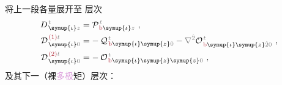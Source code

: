 将上一段各量展开至  层次
\begin{subequations} \label{eq:DH^(2-0)_0}
\begin{align}
	D^{\;\!\mathcolor{gray}{t}}_{\;\! \symup{\iota}\mathcolor{gray}{z}} &= {\mathcal{P}}^{\;\!\mathcolor{gray}{t}}_{\;\!\textcolor{Maroon}{\text{b}} \symup{\iota} \mathcolor{gray}{z}}~, \label{eq:D^(0)} \\
	{\mathcal{D}}^{\;\!\textcolor{Maroon}{(1)}\mathcolor{gray}{t}}_{\;\! \symup{\iota}\mathcolor{gray}{0}} &= -\hspace{0.2em} {\mathcal{Q}}^{\;\!\mathcolor{gray}{t}}_{\;\!\textcolor{Maroon}{\text{b}} \symup{\iota}\symup{z} \mathcolor{gray}{0}} - \mathcolor{gray}{\nabla^{\hat{2}}} {\mathcal{O}}^{\;\!\mathcolor{gray}{t}}_{\;\!\textcolor{Maroon}{\text{b}} \symup{\iota} \symup{z} \mathcolor{gray}{\hat{2}} \mathcolor{gray}{0}}~, \label{eq:D^(1)_0} \\
	{\mathcal{D}}^{\;\!\textcolor{Maroon}{(2)}\mathcolor{gray}{t}}_{\;\! \symup{\iota}\mathcolor{gray}{0}} &= -\hspace{0.2em} {\mathcal{O}}^{\;\!\mathcolor{gray}{t}}_{\;\!\textcolor{Maroon}{\text{b}} \symup{\iota} \symup{z}\symup{z} \mathcolor{gray}{0}}~, \label{eq:D^(2)_0}
\end{align}
\end{subequations}
及其下一（裸\textcolor{Plum}{多极}矩）层次\cite{OriginDependenceMaterial,langeCompletionMultipoleTheory2003,raabTransformedMultipoleTheory2005,grahamMultipoleSolutionMacroscopic2000}：
